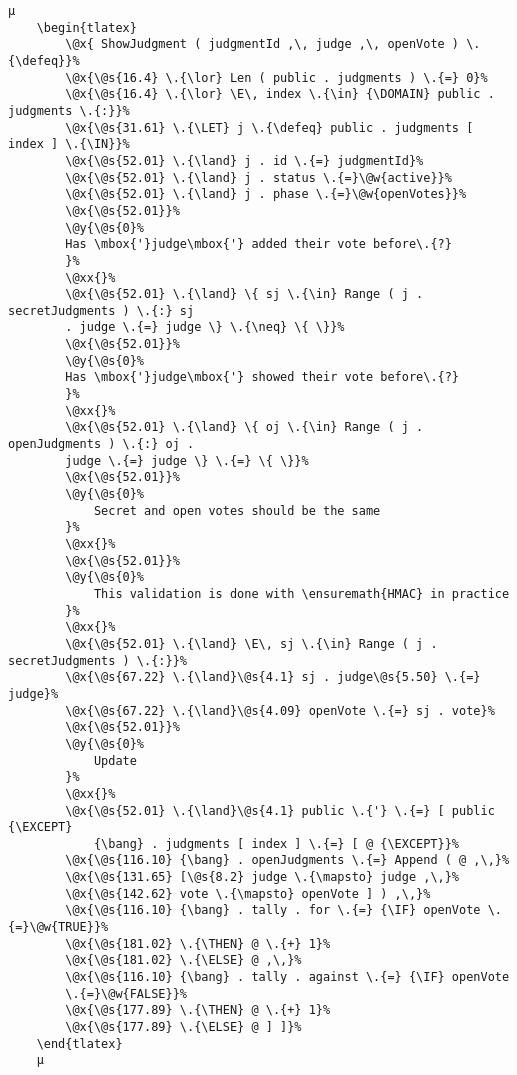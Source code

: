 \begin{lstlisting}[caption=Chaincode for revealing a vote, label=lst:ModelRevealVoteChaincode]
	µ
	\begin{tlatex}
        \@x{ ShowJudgment ( judgmentId ,\, judge ,\, openVote ) \.{\defeq}}%
        \@x{\@s{16.4} \.{\lor} Len ( public . judgments ) \.{=} 0}%
        \@x{\@s{16.4} \.{\lor} \E\, index \.{\in} {\DOMAIN} public . judgments \.{:}}%
        \@x{\@s{31.61} \.{\LET} j \.{\defeq} public . judgments [ index ] \.{\IN}}%
        \@x{\@s{52.01} \.{\land} j . id \.{=} judgmentId}%
        \@x{\@s{52.01} \.{\land} j . status \.{=}\@w{active}}%
        \@x{\@s{52.01} \.{\land} j . phase \.{=}\@w{openVotes}}%
        \@x{\@s{52.01}}%
        \@y{\@s{0}%
        Has \mbox{'}judge\mbox{'} added their vote before\.{?}
        }%
        \@xx{}%
        \@x{\@s{52.01} \.{\land} \{ sj \.{\in} Range ( j . secretJudgments ) \.{:} sj
        . judge \.{=} judge \} \.{\neq} \{ \}}%
        \@x{\@s{52.01}}%
        \@y{\@s{0}%
        Has \mbox{'}judge\mbox{'} showed their vote before\.{?}
        }%
        \@xx{}%
        \@x{\@s{52.01} \.{\land} \{ oj \.{\in} Range ( j . openJudgments ) \.{:} oj .
        judge \.{=} judge \} \.{=} \{ \}}%
        \@x{\@s{52.01}}%
        \@y{\@s{0}%
            Secret and open votes should be the same
        }%
        \@xx{}%
        \@x{\@s{52.01}}%
        \@y{\@s{0}%
            This validation is done with \ensuremath{HMAC} in practice
        }%
        \@xx{}%
        \@x{\@s{52.01} \.{\land} \E\, sj \.{\in} Range ( j . secretJudgments ) \.{:}}%
        \@x{\@s{67.22} \.{\land}\@s{4.1} sj . judge\@s{5.50} \.{=} judge}%
        \@x{\@s{67.22} \.{\land}\@s{4.09} openVote \.{=} sj . vote}%
        \@x{\@s{52.01}}%
        \@y{\@s{0}%
            Update
        }%
        \@xx{}%
        \@x{\@s{52.01} \.{\land}\@s{4.1} public \.{'} \.{=} [ public {\EXCEPT}
            {\bang} . judgments [ index ] \.{=} [ @ {\EXCEPT}}%
        \@x{\@s{116.10} {\bang} . openJudgments \.{=} Append ( @ ,\,}%
        \@x{\@s{131.65} [\@s{8.2} judge \.{\mapsto} judge ,\,}%
        \@x{\@s{142.62} vote \.{\mapsto} openVote ] ) ,\,}%
        \@x{\@s{116.10} {\bang} . tally . for \.{=} {\IF} openVote \.{=}\@w{TRUE}}%
        \@x{\@s{181.02} \.{\THEN} @ \.{+} 1}%
        \@x{\@s{181.02} \.{\ELSE} @ ,\,}%
        \@x{\@s{116.10} {\bang} . tally . against \.{=} {\IF} openVote
        \.{=}\@w{FALSE}}%
        \@x{\@s{177.89} \.{\THEN} @ \.{+} 1}%
        \@x{\@s{177.89} \.{\ELSE} @ ] ]}%
    \end{tlatex}
    µ
\end{lstlisting}

